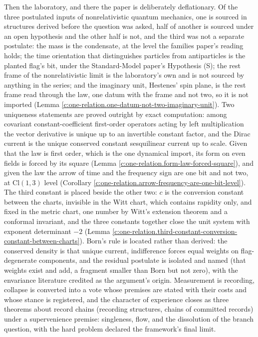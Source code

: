 \documentclass[11pt]{article}
\theoremstyle{definition}
\theoremstyle{plain}
\providecommand{\Cl}{}\renewcommand{\Cl}{\mathrm{Cl}}
\begin{document}
Then the laboratory, and there the paper is deliberately deflationary. Of the three postulated inputs of nonrelativistic quantum mechanics, one is sourced in structures derived before the question was asked, half of another is sourced under an open hypothesis and the other half is not, and the third was not a separate postulate: the mass is the condensate, at the level the families paper's reading holds; the time orientation that distinguishes particles from antiparticles is the planted flag's bit, under the Standard-Model paper's Hypothesis (S); the rest frame of the nonrelativistic limit is the laboratory's own and is not sourced by anything in the series; and the imaginary unit, Hestenes' spin plane, is the rest frame read through the law, one datum with the frame and not two, so it is not imported (Lemma \ref{c:one-relation.one-datum-not-two-imaginary-unit}). Two uniqueness statements are proved outright by exact computation: among covariant constant-coefficient first-order operators acting by left multiplication the vector derivative is unique up to an invertible constant factor, and the Dirac current is the unique conserved constant sesquilinear current up to scale. Given that the law is first order, which is the one dynamical import, its form on even fields is forced by its square (Lemma \ref{c:one-relation.form-law-forced-square}), and given the law the arrow of time and the frequency sign are one bit and not two, at $\Cl(1,3)$ level (Corollary \ref{c:one-relation.arrow-frequency-are-one-bit-level}). The third constant is placed beside the other two: $c$ is the conversion constant between the charts, invisible in the Witt chart, which contains rapidity only, and fixed in the metric chart, one number by Witt's extension theorem and a conformal invariant, and the three constants together close the unit system with exponent determinant $-2$ (Lemma \ref{c:one-relation.third-constant-conversion-constant-between-charts}). Born's rule is located rather than derived: the conserved density is that unique current, indifference forces equal weights on flag-degenerate components, and the residual postulate is isolated and named (that weights exist and add, a fragment smaller than Born but not zero), with the envariance literature credited as the argument's origin. Measurement is recording, collapse is converted into a vote whose premises are stated with their costs and whose stance is registered, and the character of experience closes as three theorems about record chains (recording structures, chains of committed records) under a supervenience premise: singleness, flow, and the dissolution of the branch question, with the hard problem declared the framework's final limit.
\end{document}
